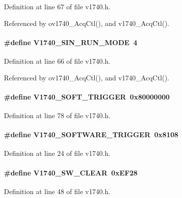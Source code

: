 Definition at line 67 of file v1740.h.

Referenced by ov1740\_\-AcqCtl(), and v1740\_\-AcqCtl().
\paragraph[{V1740\_\-SIN\_\-RUN\_\-MODE}]{\setlength{\rightskip}{0pt plus 5cm}\#define V1740\_\-SIN\_\-RUN\_\-MODE~4}\hfill\label{v1740_8h_afbf5c44dbdaa1043ccd658d67fddcc3c}


Definition at line 66 of file v1740.h.

Referenced by ov1740\_\-AcqCtl(), and v1740\_\-AcqCtl().
\paragraph[{V1740\_\-SOFT\_\-TRIGGER}]{\setlength{\rightskip}{0pt plus 5cm}\#define V1740\_\-SOFT\_\-TRIGGER~0x80000000}\hfill\label{v1740_8h_a7d7f316b5b07e43ddf05c273294e0bc9}


Definition at line 78 of file v1740.h.
\paragraph[{V1740\_\-SOFTWARE\_\-TRIGGER}]{\setlength{\rightskip}{0pt plus 5cm}\#define V1740\_\-SOFTWARE\_\-TRIGGER~0x8108}\hfill\label{v1740_8h_a616c29cc9d38e598ff9873551b00aebc}


Definition at line 24 of file v1740.h.
\paragraph[{V1740\_\-SW\_\-CLEAR}]{\setlength{\rightskip}{0pt plus 5cm}\#define V1740\_\-SW\_\-CLEAR~0xEF28}\hfill\label{v1740_8h_ae4cde348440f6ed5406c0ad1574cb678}


Definition at line 48 of file v1740.h.
